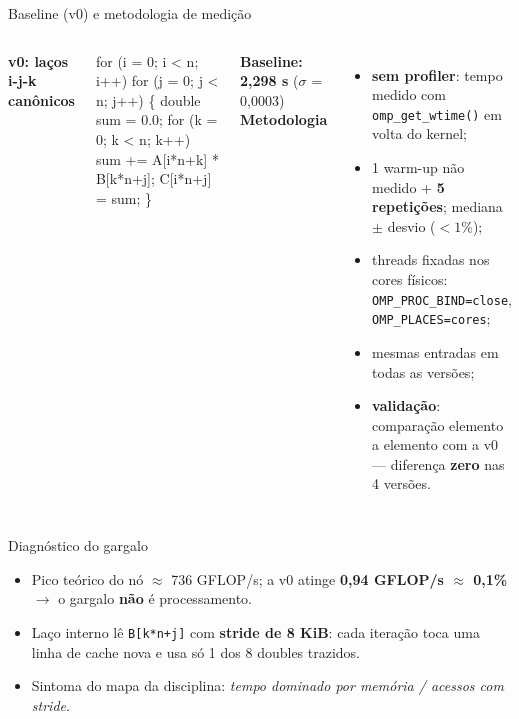 \documentclass[10pt,aspectratio=169]{beamer}
\begin{document}
\begin{frame}[fragile]{Baseline (v0) e metodologia de medição}
  \begin{columns}[T]
      \textbf{v0: laços i-j-k canônicos}
\begin{semiverbatim}\small
for (i = 0; i < n; i++)
  for (j = 0; j < n; j++) \{
    double sum = 0.0;
    for (k = 0; k < n; k++)
      sum += A[i*n+k] * B[k*n+j];
    C[i*n+j] = sum;
  \}
\end{semiverbatim}
      \textbf{Baseline: 2,298 s} ($\sigma$ = 0,0003)
      \textbf{Metodologia}
      \begin{itemize}
        \item \textbf{sem profiler}: tempo medido com \texttt{omp\_get\_wtime()} em volta do kernel;
        \item 1 warm-up não medido + \textbf{5 repetições}; mediana $\pm$ desvio ($<1\%$);
        \item threads fixadas nos cores físicos:\\ \texttt{OMP\_PROC\_BIND=close}, \texttt{OMP\_PLACES=cores};
        \item mesmas entradas em todas as versões;
        \item \textbf{validação}: comparação elemento a elemento com a v0 --- diferença \textbf{zero} nas 4 versões.
      \end{itemize}
  \end{columns}
\end{frame}

\begin{frame}{Diagnóstico do gargalo}
  \begin{itemize}
    \item Pico teórico do nó $\approx$ 736 GFLOP/s; a v0 atinge \textbf{0,94 GFLOP/s $\approx$ 0,1\%} $\rightarrow$ o gargalo \textbf{não} é processamento.
    \item Laço interno lê \texttt{B[k*n+j]} com \textbf{stride de 8 KiB}: cada iteração toca uma linha de cache nova e usa só 1 dos 8 doubles trazidos.
    \item Sintoma do mapa da disciplina: \emph{tempo dominado por memória / acessos com stride}.
  \end{itemize}
\end{frame}
\end{document}
